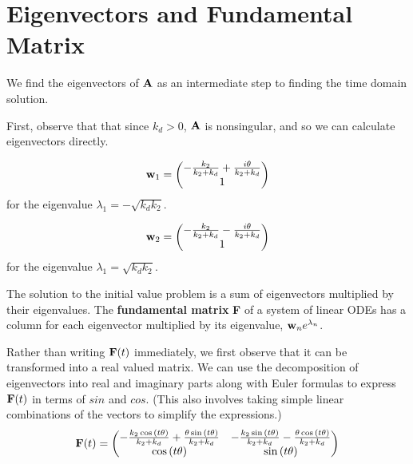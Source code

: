 \documentclass[11pt]{article}
\begin{document}
\section{Eigenvectors and Fundamental Matrix}

We find the eigenvectors of ${\bf A}$ as an intermediate step to
finding the time domain solution.

First, observe that that since $k_d > 0$, ${\bf A}$ is nonsingular,
and so we can calculate eigenvectors directly.

\begin{equation*}
    {\bf w}_1 =
    \begin{pmatrix}
- \frac{k_{2}}{k_{2} + k_{d}}
+ \frac{i \theta}{k_{2} + k_{d}} 
\\ 1
\end{pmatrix}
\end{equation*}
for the eigenvalue $\lambda_1 = - \sqrt{k_d k_2}$.

\begin{equation*}
    {\bf w}_2 =
    \begin{pmatrix}
- \frac{k_{2}}{k_{2} + k_{d}}
- \frac{i \theta}{k_{2} + k_{d}} 
\\ 1
\end{pmatrix}
\end{equation*}
for the eigenvalue $\lambda_1 = \sqrt{k_d k_2}$.

The solution to the initial value problem is a sum of eigenvectors
multiplied by their eigenvalues.
The {\bf fundamental matrix} {\bf F} of a system of 
linear ODEs has a column
for each eigenvector multiplied by its eigenvalue,
${\bf w}_n e^{\lambda_n}$.

Rather than writing ${\bf F} (t)$ immediately, we first
observe that it can be transformed into
a real valued matrix.
We can use the decomposition of eigenvectors into
real and imaginary parts along with Euler formulas
to express ${\bf F}(t)$
in terms of $sin$ and $cos$.
(This also involves taking simple linear
combinations of the vectors to simplify the expressions.)
\begin{equation*}
{\bf F} (t) = \begin{pmatrix}- \frac{k_{2} \cos{\left(t \theta \right)}}{k_{2} + k_{d}} 
+ \frac{\theta \sin{\left(t \theta \right)}}{k_{2} + k_{d}} & - \frac{k_{2} \sin{\left(t \theta \right)}}{k_{2} + k_{d}} - \frac{\theta \cos{\left(t \theta \right)}}{k_{2} + k_{d}}\\\cos{\left(t \theta \right)} & \sin{\left(t \theta \right)}
\end{pmatrix}
\end{equation*}
\end{document}
